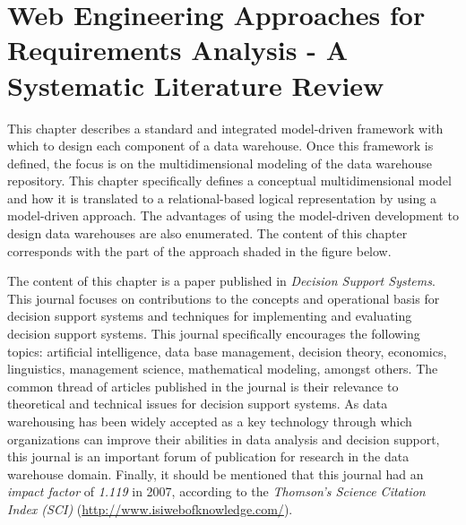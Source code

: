 %
%
%



\chapter{Web Engineering Approaches for Requirements Analysis - A Systematic Literature Review}
\label{c3} %


This chapter describes a standard and integrated model-driven
framework with which to design each component of a data warehouse.
Once this framework is defined, the focus is on the multidimensional
modeling of the data warehouse repository. This chapter specifically
defines a conceptual multidimensional model and how it is translated
to a relational-based logical representation by using a model-driven
approach. The advantages of using the model-driven development to
design data warehouses are also enumerated. The content of this
chapter corresponds with the part of the approach shaded in the
figure below.


The content of this chapter is a paper published in \emph{Decision
Support Systems}. This journal focuses on contributions to the
concepts and operational basis for decision support systems and
techniques for implementing and evaluating decision support systems.
This journal specifically encourages the following topics:
artificial intelligence, data base management, decision theory,
economics, linguistics, management science, mathematical modeling,
amongst others. The common thread of articles published in the
journal is their relevance to theoretical and technical issues for
decision support systems. As data warehousing has been widely
accepted as a key technology through which organizations can improve
their abilities in data analysis and decision support, this journal
is an important forum of publication for research in the data
warehouse domain. Finally, it should be mentioned that this journal
had an \emph{impact factor} of \emph{1.119} in 2007, according to
the \emph{Thomson's Science Citation Index (SCI)}
(\url{http://www.isiwebofknowledge.com/}).






%
